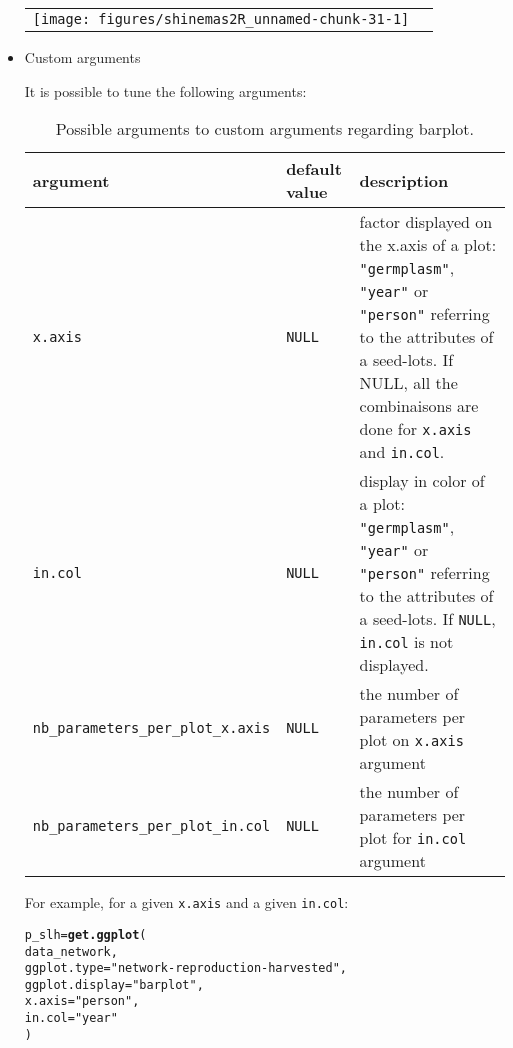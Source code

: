 \documentclass{article}\usepackage[]{graphicx}\usepackage[]{color}
\makeatletter
\newcommand{\hlstr}[1]{\textcolor[rgb]{0.192,0.494,0.8}{#1}}%
\newcommand{\hlstd}[1]{\textcolor[rgb]{0.345,0.345,0.345}{#1}}%
\newcommand{\hlkwb}[1]{\textcolor[rgb]{0.69,0.353,0.396}{#1}}%
\newcommand{\hlkwc}[1]{\textcolor[rgb]{0.333,0.667,0.333}{#1}}%
\newcommand{\hlkwd}[1]{\textcolor[rgb]{0.737,0.353,0.396}{\textbf{#1}}}%
\newenvironment{kframe}{%
 \def\at@end@of@kframe{}%
 \ifinner\ifhmode%
  \def\at@end@of@kframe{\end{minipage}}%
  \begin{minipage}{\columnwidth}%
 \fi\fi%
 \def\FrameCommand##1{\hskip\@totalleftmargin \hskip-\fboxsep
 \colorbox{shadecolor}{##1}\hskip-\fboxsep
     \hskip-\linewidth \hskip-\@totalleftmargin \hskip\columnwidth}%
 \MakeFramed {\advance\hsize-\width
   \@totalleftmargin\z@ \linewidth\hsize
   \@setminipage}}%
 {\par\unskip\endMakeFramed%
 \at@end@of@kframe}
\newenvironment{knitrout}{}{} %
\makeatother
\begin{document}
\begin{itemize}
\begin{center}
\begin{tabular}{cc}
\begin{knitrout}
{\centering \texttt{[image: figures/shinemas2R\_unnamed-chunk-31-1]} 

}



\end{knitrout}
\\
\end{tabular}
\end{center}

\item Custom arguments

It is possible to tune the following arguments:

\begin{center}
\begin{table}[H]
\begin{tabular}{ p{} p{} p{} }
\hline
argument & default value & description \\
\hline

\texttt{x.axis} & \texttt{NULL} & factor displayed on the x.axis of a plot: \texttt{"germplasm"}, \texttt{"year"} or \texttt{"person"} referring to the attributes of a seed-lots. If NULL, all the combinaisons are done for \texttt{x.axis} and \texttt{in.col}. \\
\hline

\texttt{in.col} & \texttt{NULL} & display in color of a plot: \texttt{"germplasm"}, \texttt{"year"} or \texttt{"person"} referring to the attributes of a seed-lots. If \texttt{NULL}, \texttt{in.col} is not displayed. \\
\hline

\texttt{nb\_parameters\_per\_plot\_x.axis} & \texttt{NULL} & the number of parameters per plot on \texttt{x.axis} argument \\
\hline

\texttt{nb\_parameters\_per\_plot\_in.col} & \texttt{NULL} & the number of parameters per plot for \texttt{in.col} argument \\

\hline
\end{tabular}
\caption{Possible arguments to custom arguments regarding barplot.}
\label{custom.barplot}
\end{table}
\end{center}



For example, for a given \texttt{x.axis} and a given \texttt{in.col}:
\begin{knitrout}
\color{fgcolor}\begin{kframe}
\begin{alltt}
\hlstd{p_slh} \hlkwb{=} \hlkwd{get.ggplot}\hlstd{(}
        \hlstd{data_network,}
        \hlkwc{ggplot.type} \hlstd{=} \hlstr{"network-reproduction-harvested"}\hlstd{,}
        \hlkwc{ggplot.display} \hlstd{=} \hlstr{"barplot"}\hlstd{,}
        \hlkwc{x.axis} \hlstd{=} \hlstr{"person"}\hlstd{,}
        \hlkwc{in.col} \hlstd{=} \hlstr{"year"}
        \hlstd{)}
\end{alltt}
\end{kframe}
\end{knitrout}


\end{itemize}
\end{document}
